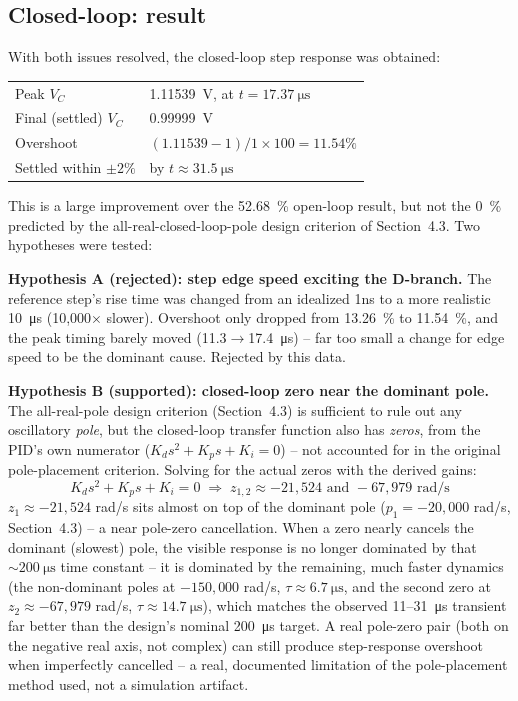 \documentclass[11pt,letterpaper]{article}
\begin{document}
\subsection{Closed-loop: result}

With both issues resolved, the closed-loop step response was obtained:

\begin{center}
\begin{tabular}{@{}ll@{}}
\toprule
Peak $V_C$ & \SI{1.11539}{\volt}, at $t=\SI{17.37}{\micro\second}$ \\
Final (settled) $V_C$ & \SI{0.99999}{\volt} \\
Overshoot & $(1.11539-1)/1\times100 = \boxed{11.54\%}$ \\
Settled within $\pm2\%$ & by $t\approx\SI{31.5}{\micro\second}$ \\
\bottomrule
\end{tabular}
\end{center}

This is a large improvement over the \SI{52.68}{\percent} open-loop result, but not the
\SI{0}{\percent} predicted by the all-real-closed-loop-pole design criterion of Section~4.3. Two
hypotheses were tested:

\textbf{Hypothesis A (rejected): step edge speed exciting the D-branch.} The reference step's rise time
was changed from an idealized 1ns to a more realistic \SI{10}{\micro\second} (10,000$\times$ slower).
Overshoot only dropped from \SI{13.26}{\percent} to \SI{11.54}{\percent}, and the peak timing barely
moved (\SI{11.3}{}$\to$\SI{17.4}{\micro\second}) -- far too small a change for edge speed to be the
dominant cause. Rejected by this data.

\textbf{Hypothesis B (supported): closed-loop zero near the dominant pole.} The all-real-pole design
criterion (Section~4.3) is sufficient to rule out any oscillatory \emph{pole}, but the closed-loop
transfer function also has \emph{zeros}, from the PID's own numerator ($K_ds^2+K_ps+K_i=0$) -- not
accounted for in the original pole-placement criterion. Solving for the actual zeros with the derived
gains:
\begin{equation}
K_ds^2+K_ps+K_i=0 \;\Rightarrow\; z_{1,2} \approx -21{,}524 \text{ and } -67{,}979 \text{ rad/s}
\end{equation}
$z_1\approx-21{,}524$ rad/s sits almost on top of the dominant pole ($p_1=-20{,}000$ rad/s, Section~4.3)
-- a near pole-zero cancellation. When a zero nearly cancels the dominant (slowest) pole, the visible
response is no longer dominated by that $\sim\SI{200}{\micro\second}$ time constant -- it is dominated
by the remaining, much faster dynamics (the non-dominant poles at $-150{,}000$ rad/s, $\tau\approx\SI{6.7}{\micro\second}$,
and the second zero at $z_2\approx-67{,}979$ rad/s, $\tau\approx\SI{14.7}{\micro\second}$), which matches
the observed \SI{11}{}--\SI{31}{\micro\second} transient far better than the design's nominal
\SI{200}{\micro\second} target. A real pole-zero pair (both on the negative real axis, not complex) can
still produce step-response overshoot when imperfectly cancelled -- a real, documented limitation of the
pole-placement method used, not a simulation artifact.
\end{document}
